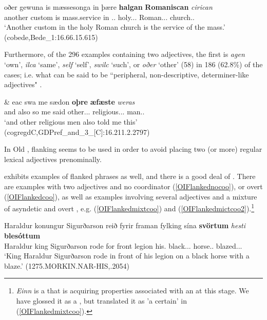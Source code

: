 \documentclass[output=paper,colorlinks,citecolor=brown,draft]{langscibook}
\begin{document}
\ea\label{OEtwopren}
\gll oðer gewuna is mæssesonga in þære \textbf{halgan} \textbf{Romaniscan} \textit{cirican}\\
	another custom is mass.service in \DEF.\DAT.\SG{} holy.\DAT.\SG.\WK{} Roman.\DAT.\SG.\WK{} 	church.\DAT.\SG{}\\
\glt ‘Another custom in the holy Roman church is the service of the mass.’ (cobede,Bede\_1:16.66.15.615)
\z

Furthermore, of the 296 examples containing two  adjectives, the first  is \textit{agen} ‘own’, \textit{ilca} ‘same’, \textit{self} ‘self’, \textit{swilc} ‘such’, or \textit{oðer} ‘other’ (58) in 186 (62.8\%) of the cases; i.e. what can be said to be “peripheral, non-descriptive, determiner-like adjectives" \citep[see][12]{Bech17}. 

\ea\label{OEtwopren2}
\gll \& eac swa me sædon \textbf{oþre} \textbf{æfæste} \textit{weras}\\
	and also so me said other.\NOM.\PL.\STR{} religious.\NOM.\PL.\STR{} man.\NOM.\PL{}\\
\glt ‘and other religious men also told me this’ (cogregdC,GDPref\_and\_3\_[C]:16.211.2.2797)
\z

In Old , flanking seems to be used in order to avoid placing two (or more) regular lexical adjectives prenominally. 

 exhibits examples of flanked  phrases as well, and there is a good deal of . There are examples with two adjectives and no coordinator (\ref{OIFlankednocoo}), or overt  (\ref{OIFlankedcoo}), as well as examples involving several adjectives and a mixture of asyndetic  and overt , e.g. (\ref{OIFlankedmixtcoo}) and (\ref{OIFlankedmictcoo2}).\footnote{\textit{Einn} is a  that is acquiring properties associated with an   at this stage. We have glossed it as a , but translated it as 'a certain' in (\ref{OIFlankedmixtcoo}).}

\ea\label{OIFlankednocoo}
\gll Haraldur konungur Sigurðarson reið fyrir framan fylking sína \textbf{svörtum} \textit{hesti}	\textbf{blesóttum}\\
Haraldur king Sigurðarson rode for front legion his.\REFL{} black.\DAT.\SG.\STR{} horse.\DAT.\SG{} {blazed.\DAT.\SG.\STR{}}\\
\glt ‘King Haraldur Sigurðarson rode in front of his legion on a black horse with a blaze.’ (1275.MORKIN.NAR-HIS,.2054)
\z
\end{document}
